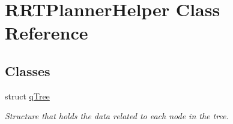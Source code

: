 \hypertarget{classRRTPlannerHelper}{}\section{R\+R\+T\+Planner\+Helper Class Reference}
\label{classRRTPlannerHelper}
\subsection*{Classes}
\begin{DoxyCompactItemize}
\item 
struct \hyperlink{structRRTPlannerHelper_1_1qTree}{q\+Tree}
\begin{DoxyCompactList}\small\item\em Structure that holds the data related to each node in the tree. \end{DoxyCompactList}\end{DoxyCompactItemize}
